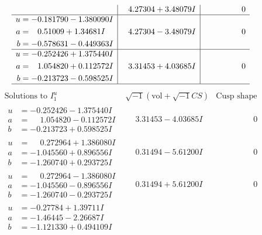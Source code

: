 \documentclass[1p]{elsarticle_modified}
\theoremstyle{definition}
\newcommand{\I}{\sqrt{-1}}
\begin{document}
$$\begin{array}{c|c|c}
 & \phantom{-}4.27304 + 3.48079 I & \phantom{-0.000000 } 0 \\ \hline\begin{aligned}
u &= -0.181790 - 1.380090 I \\
a &= \phantom{-}0.51009 + 1.34681 I \\
b &= -0.578631 - 0.449363 I\end{aligned}
 & \phantom{-}4.27304 - 3.48079 I & \phantom{-0.000000 } 0 \\ \hline\begin{aligned}
u &= -0.252426 + 1.375440 I \\
a &= \phantom{-}1.054820 + 0.112572 I \\
b &= -0.213723 - 0.598525 I\end{aligned}
 & \phantom{-}3.31453 + 4.03685 I & \phantom{-0.000000 } 0\\
 \hline 
 \end{array}$$\newpage$$\begin{array}{c|c|c}  
\text{Solutions to }I^u_{1}& \I (\text{vol} + \sqrt{-1}CS) & \text{Cusp shape}\\
 \hline 
\begin{aligned}
u &= -0.252426 - 1.375440 I \\
a &= \phantom{-}1.054820 - 0.112572 I \\
b &= -0.213723 + 0.598525 I\end{aligned}
 & \phantom{-}3.31453 - 4.03685 I & \phantom{-0.000000 } 0 \\ \hline\begin{aligned}
u &= \phantom{-}0.272964 + 1.386080 I \\
a &= -1.045560 + 0.896556 I \\
b &= -1.260740 + 0.293725 I\end{aligned}
 & \phantom{-}0.31494 - 5.61200 I & \phantom{-0.000000 } 0 \\ \hline\begin{aligned}
u &= \phantom{-}0.272964 - 1.386080 I \\
a &= -1.045560 - 0.896556 I \\
b &= -1.260740 - 0.293725 I\end{aligned}
 & \phantom{-}0.31494 + 5.61200 I & \phantom{-0.000000 } 0 \\ \hline\begin{aligned}
u &= -0.27784 + 1.39711 I \\
a &= -1.46445 - 2.26687 I \\
b &= -1.121330 + 0.494109 I\end{aligned}

\end{array}$$
\end{document}
